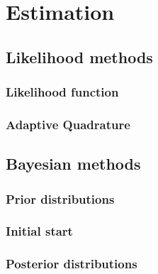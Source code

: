 \chapter{Estimation} \label{chap:estimation}


\section{Likelihood methods}

\subsection{Likelihood function}

\subsection{Adaptive Quadrature}


\section{Bayesian methods}

\subsection{Prior distributions}

\subsection{Initial start}

\subsection{Posterior distributions}



